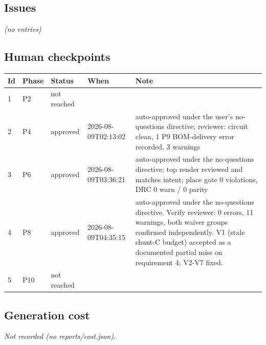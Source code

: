 \documentclass[11pt,a4paper]{article}
\begin{document}
\subsection*{Issues}
\emph{(no entries)}
\subsection*{Human checkpoints}
{\small
\begin{longtable}{lllp{2.6cm}p{6.4cm}}
\toprule
\textbf{Id} & \textbf{Phase} & \textbf{Status} & \textbf{When} & \textbf{Note} \\
\midrule
\endhead
1 & P2 & not reached &  &  \\
2 & P4 & approved & 2026-08-09T02:13:02 & auto-approved under the user's no-questions directive; reviewer: circuit clean, 1 P9 BOM-delivery error recorded, 3 warnings \\
3 & P6 & approved & 2026-08-09T03:36:21 & auto-approved under the no-questions directive; top render reviewed and matches intent; place gate 0 violations, DRC 0 warn / 0 parity \\
4 & P8 & approved & 2026-08-09T04:35:15 & auto-approved under the no-questions directive. Verify reviewer: 0 errors, 11 warnings, both waiver groups confirmed independently. V1 (stale shunt-C budget) accepted as a documented partial miss on requirement 4; V2-V7 fixed. \\
5 & P10 & not reached &  &  \\
\bottomrule
\end{longtable}
}
\subsection*{Generation cost}
\emph{Not recorded (no reports/cost.json).}
\end{document}
